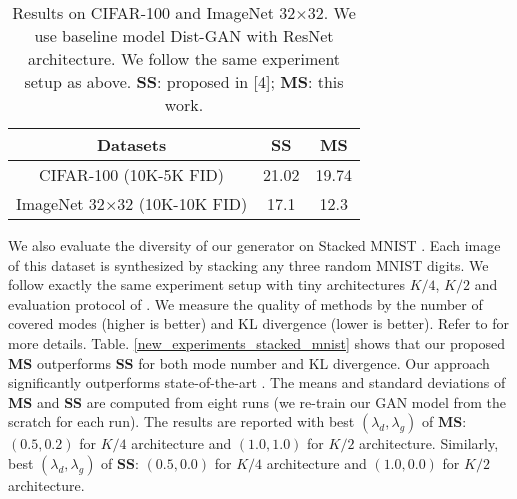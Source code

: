 \documentclass{article}
\begin{document}
\begin{table}
    \small
    \centering
    \caption{Results on CIFAR-100 and ImageNet 32$\times$32. We use baseline model Dist-GAN with ResNet architecture. We  follow the same experiment setup as above. {\bf SS}: proposed in [4]; {\bf MS}: this work.}
    \begin{tabular}{ c  c  c }
    \toprule
    \textbf{Datasets} & \textbf{SS} & \textbf{MS} \\
    \hline
    CIFAR-100 (10K-5K FID)                    & 21.02 & 19.74  \\
ImageNet 32$\times$32 (10K-10K FID)       & 17.1 & 12.3 \\
    \bottomrule
    \end{tabular}
    \label{new_experiments_cifar100_imagenet}
    \vspace{-0.4cm}
\end{table}

We also evaluate the diversity of our generator on Stacked MNIST \cite{metz-arxiv-2016}. Each image of this dataset is synthesized by stacking any three random MNIST digits. We follow exactly the same experiment setup with tiny architectures $K/4$, $K/2$ and evaluation protocol of \cite{metz-arxiv-2016}. We measure the quality of methods by the number of covered modes (higher is better) and KL divergence (lower is better). Refer to \cite{metz-arxiv-2016} for more details. Table. \ref{new_experiments_stacked_mnist} shows that our proposed \textbf{MS} outperforms \textbf{SS} for both mode number and KL divergence. Our approach  significantly outperforms state-of-the-art \cite{tran-eccv-2018,karras-iclr-2018}. The means and standard deviations of \textbf{MS} and \textbf{SS} are computed from eight runs (we re-train our GAN model from the scratch for each run). The results are reported with best $(\lambda_d,\lambda_g)$ of $\mathbf{MS}$: $(0.5, 0.2)$ for $K/4$ architecture and $(1.0, 1.0)$ for $K/2$ architecture. Similarly, best $(\lambda_d,\lambda_g)$ of $\mathbf{SS}$: $(0.5, 0.0)$ for $K/4$ architecture and $(1.0, 0.0)$ for $K/2$ architecture.
\end{document}
